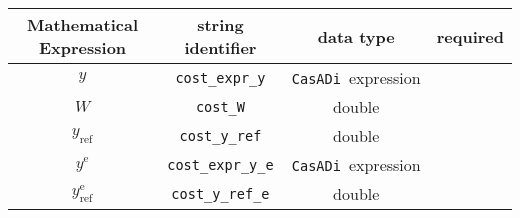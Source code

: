 \documentclass{article}
\newcommand{\code}[1]{\texttt{#1}}
\newcommand{\casadi}{\texttt{CasADi}}
\newcommand{\terminal}{^{\textrm{e}}}
\begin{document}
\begin{table}[h!]
	\centering
	\begin{tabular}{|c|c|c|c|}
		\toprule
		Mathematical Expression & string identifier & data type & required \\ \midrule
		$ y $ & \code{cost\_expr\_y}    & \casadi~expression  & \mandatory   \\ \midrule
		$ W $ & \code{cost\_W}    & double  & \mandatory   \\ \midrule
		$ y_{\textrm{ref}} $ & \code{cost\_y\_ref}    & double & \mandatory    \\ \midrule
		$ y\terminal $ & \code{cost\_expr\_y\_e}    & \casadi~expression  & \mandatory   \\ \midrule
		$ y_{\textrm{ref}}\terminal $ & \code{cost\_y\_ref\_e}    & double  & \mandatory   \\
		\bottomrule
	\end{tabular}
\end{table}
\end{document}
